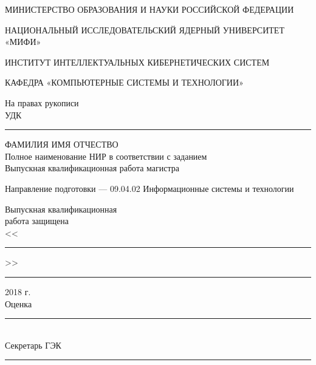 \documentclass[a4paper,12pt]{article}
\begin{document}

\renewcommand{\refname}{\centerline{СПИСОК ИСПОЛЬЗОВАННОЙ ЛИТЕРАТУРЫ}} 
\renewcommand{\contentsname}{\centerline{СОДЕРЖАНИЕ}} 

%
%
\thispagestyle{empty}



\begin{center}
\doublespacing

МИНИСТЕРСТВО ОБРАЗОВАНИЯ И НАУКИ РОССИЙСКОЙ ФЕДЕРАЦИИ

НАЦИОНАЛЬНЫЙ ИССЛЕДОВАТЕЛЬСКИЙ ЯДЕРНЫЙ УНИВЕРСИТЕТ «МИФИ»

ИНСТИТУТ ИНТЕЛЛЕКТУАЛЬНЫХ КИБЕРНЕТИЧЕСКИХ СИСТЕМ

КАФЕДРА «КОМПЬЮТЕРНЫЕ СИСТЕМЫ И ТЕХНОЛОГИИ»
\end{center}

\onehalfspacing

\vspace{1cm}
\begin{flushright}
На правах рукописи\\
УДК \rule{27mm}{0.15mm}
\end{flushright}

\vspace{1cm}

\begin{center}
\doublespacing
\large 
ФАМИЛИЯ ИМЯ ОТЧЕСТВО\\

Полное наименование НИР в соответствии с заданием\\

Выпускная квалификационная работа магистра
\end{center}

\begin{center}
Направление подготовки ---  09.04.02 Информационные системы и технологии\\
\end{center}

\vspace{2cm}

\begin{flushright}
\begin{minipage}{60mm}
Выпускная квалификационная\\
работа защищена\\
<<\rule{10mm}{0.15mm}>>\rule{32mm}{0.15mm}2018 г.\\
Оценка \rule{43mm}{0.15mm}\\
Секретарь ГЭК \rule{27mm}{0.15mm}
\end{minipage}
\end{flushright}
\end{document}
